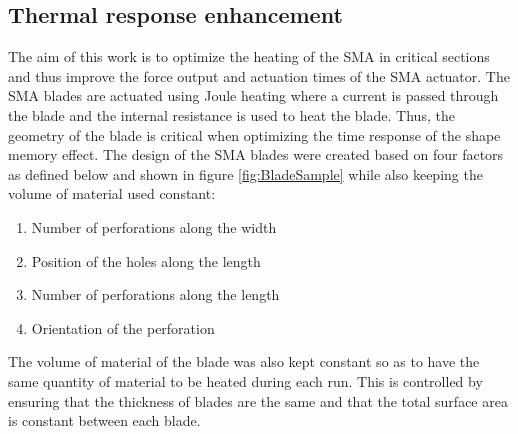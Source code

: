 \subsection{Thermal response enhancement}
The aim of this work is to optimize the heating of the SMA in critical sections and thus improve the force output and actuation times of the SMA actuator. The SMA blades are actuated using Joule heating where a current is passed through the blade and the internal resistance is used to heat the blade. Thus, the geometry of the blade is critical when optimizing the time response of the shape memory effect. The design of the SMA blades were created based on four factors as defined below and shown in figure \ref{fig:BladeSample} while also keeping the volume of material used constant:
\begin{enumerate}[label=\textbf{~~~~Factor $x_{\arabic*}$}:,align=left]
  \item Number of perforations along the width
  \item Position of the holes along the length
  \item Number of perforations along the length
  \item Orientation of the perforation
\end{enumerate}
The volume of material of the blade was also kept constant so as to have the same quantity of material to be heated during each run. This is controlled by ensuring that the thickness of blades are the same and that the total surface area is constant between each blade.


